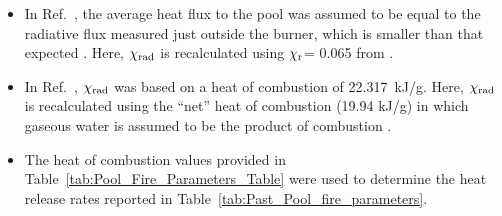 \documentclass[12pt]{article}
\begin{document}
\begin{itemize}
\item In Ref.~\cite{Klassen1994}, the average heat flux to the pool was assumed to be equal to the radiative flux measured just outside the burner, which is smaller than that expected \cite{Kim2019}. Here, $\chi_{\rm rad}$ is recalculated using $\chi_{\rm r}$= 0.065 from \cite{Kim2019}.
\item In Ref.~\cite{Klassen1994}, $\chi_{\rm rad}$ was based on a heat of combustion of 22.317~kJ/g. Here, $\chi_{\rm rad}$ is recalculated using the ``net'' heat of combustion (19.94 kJ/g) in which gaseous water is assumed to be the product of combustion \cite{Dippr}.
\item The heat of combustion values provided in Table~\ref{tab:Pool_Fire_Parameters_Table} were used to determine the heat release rates reported in Table~\ref{tab:Past_Pool_fire_parameters}.
\end{itemize}
\end{document}
